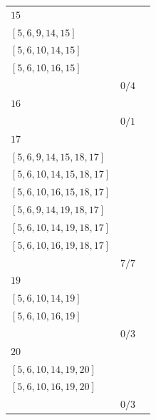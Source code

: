 \documentclass[12pt, a4paper]{extarticle}
\begin{document}
\begin{table}[h!]
\begin{tabularx}{\textwidth}{|X|X|X|}
        \hline
        $15$ & \begin{tabular}{@{}l@{}} $[5, 6, 9, 13, 15]$ \\  $[5, 6, 9, 14, 15]$ \\  $[5, 6, 10, 14, 15]$ \\  $[5, 6, 10, 16, 15]$ \\ \end{tabular} & $0/4$ \\
        \hline
        $16$ & \begin{tabular}{@{}l@{}} $[5, 6, 10, 16]$ \\ \end{tabular} & $0/1$ \\
        \hline
        $17$ & \begin{tabular}{@{}l@{}} $[5, 6, 9, 13, 15, 18, 17]$ \\  $[5, 6, 9, 14, 15, 18, 17]$ \\  $[5, 6, 10, 14, 15, 18, 17]$ \\  $[5, 6, 10, 16, 15, 18, 17]$ \\  $[5, 6, 9, 14, 19, 18, 17]$ \\  $[5, 6, 10, 14, 19, 18, 17]$ \\  $[5, 6, 10, 16, 19, 18, 17]$ \\ \end{tabular} & $7/7$ \\
        \hline
        $19$ & \begin{tabular}{@{}l@{}} $[5, 6, 9, 14, 19]$ \\  $[5, 6, 10, 14, 19]$ \\  $[5, 6, 10, 16, 19]$ \\ \end{tabular} & $0/3$ \\
        \hline
        $20$ & \begin{tabular}{@{}l@{}} $[5, 6, 9, 14, 19, 20]$ \\  $[5, 6, 10, 14, 19, 20]$ \\  $[5, 6, 10, 16, 19, 20]$ \\ \end{tabular} & $0/3$ \\
        \hline
    \end{tabularx}
\end{table}
\end{document}
